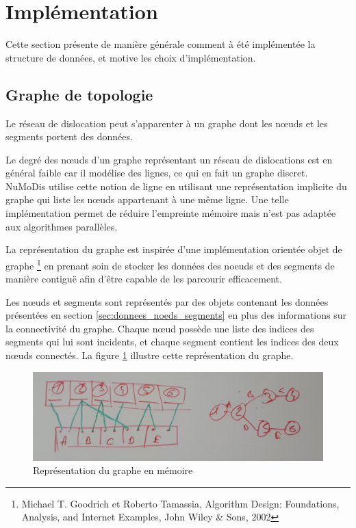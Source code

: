 \section{Implémentation}

Cette section présente de manière générale comment à été implémentée la structure de données, et motive les choix d'implémentation.

\subsection{Graphe de topologie}

Le réseau de dislocation peut s'apparenter à un graphe dont les nœuds et les segments portent des données. 

Le degré des nœuds d'un graphe représentant un réseau de dislocations est en général faible car il modélise des lignes, ce qui en fait un graphe discret. NuMoDis utilise cette notion de ligne en utilisant une représentation implicite du graphe qui liste les nœuds appartenant à une même ligne. Une telle implémentation permet de réduire l'empreinte mémoire mais n'est pas adaptée aux algorithmes parallèles.

La représentation du graphe est inspirée d'une implémentation orientée objet de graphe \footnote{Michael T. Goodrich et Roberto Tamassia, Algorithm Design: Foundations, Analysis, and Internet Examples, John Wiley \& Sons, 2002} en prenant soin de stocker les données des noeuds et des segments de manière contiguë afin d'être capable de les parcourir efficacement. 

Les nœuds et segments sont représentés par des objets contenant les données présentées en section \ref{sec:donnees_noeds_segments} en plus des informations sur la connectivité du graphe. Chaque nœud possède une liste des indices des segments qui lui sont incidents, et chaque segment contient les indices des deux nœuds connectés. La figure \ref{fig:representation_graphe} illustre cette représentation du graphe. 

\begin{figure}
	\includegraphics[width=\textwidth]{img/representation_graphe}
	\caption{Représentation du graphe en mémoire}
	\label{fig:representation_graphe}
\end{figure}

